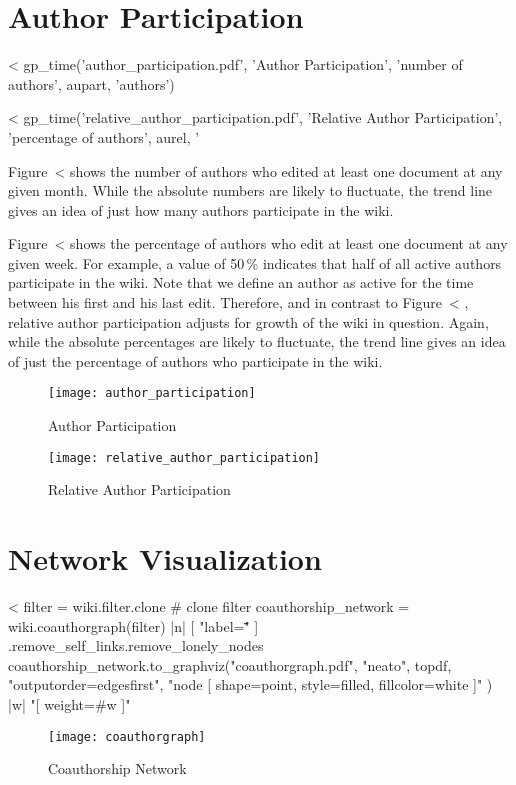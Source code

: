 \documentclass{scrartcl}
\begin{document}

\section{Author Participation} %
\label{sec:author_participation}

<%
gp_time('author_participation.pdf', 
        'Author Participation', 'number of authors', 
        aupart, 'authors')

<%
gp_time('relative_author_participation.pdf', 
        'Relative Author Participation', 
        'percentage of authors', 
        aurel, '%

Figure~<%
shows the number of authors who edited at least one document at any given month. While the absolute numbers are likely to fluctuate, the trend line gives an idea of just how many authors participate in the wiki.

Figure~<%
shows the percentage of authors who edit at least one document at any given week. For example, a value of 50\,\% indicates that half of all active authors participate in the wiki. Note that we define an author as active for the time between his first and his last edit. Therefore, and in contrast to Figure~<%
, relative author participation adjusts for growth of the wiki in question. Again, while the absolute percentages are likely to fluctuate, the trend line gives an idea of just the percentage of authors who participate in the wiki.

\begin{figure}
  \texttt{[image: author\_participation]}
  \caption{Author Participation}
  \label{fig:author_participation}
  \vfill

  \texttt{[image: relative\_author\_participation]}
  \caption{Relative Author Participation}
  \label{fig:relative_author_participation}
\end{figure}


\section{Network Visualization} %
\label{sec:network_visualization}

<%
filter = wiki.filter.clone # clone filter
coauthorship_network = wiki.coauthorgraph(filter) { |n| [ "label=\"\"" ] }.remove_self_links.remove_lonely_nodes
coauthorship_network.to_graphviz("coauthorgraph.pdf", "neato", topdf, "outputorder=edgesfirst", "node [ shape=point, style=filled, fillcolor=white ]" ) { |w|  "[ weight=#{w} ]" }
\begin{figure}[htbp]
	\centering
	\texttt{[image: coauthorgraph]}
	\caption{Coauthorship Network}
	\label{fig:coauthorship_network}
\end{figure}
\end{document}
